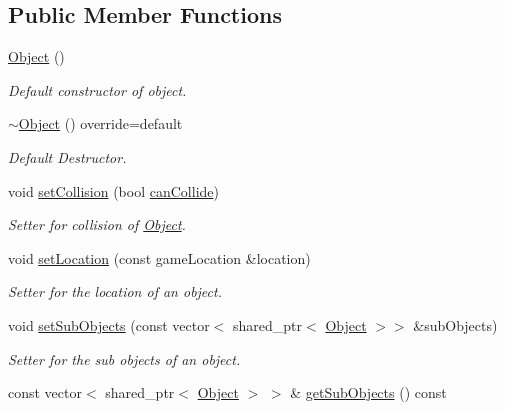 \subsection*{Public Member Functions}
\begin{DoxyCompactItemize}
\item 
\mbox{\label{classObject_a40860402e64d8008fb42329df7097cdb}} 
\hyperlink{classObject_a40860402e64d8008fb42329df7097cdb}{Object} ()
\begin{DoxyCompactList}\small\item\em Default constructor of object. \end{DoxyCompactList}\item 
\mbox{\label{classObject_ab42ffe43dbd5d5cc089493eb60245ee1}} 
\hyperlink{classObject_ab42ffe43dbd5d5cc089493eb60245ee1}{$\sim$\+Object} () override=default
\begin{DoxyCompactList}\small\item\em Default Destructor. \end{DoxyCompactList}\item 
void \hyperlink{classObject_a641a0ab489382ba76bd4c538733cc2a4}{set\+Collision} (bool \hyperlink{classObject_aafe6959a6dcbb8c036af3b489386fd98}{can\+Collide})
\begin{DoxyCompactList}\small\item\em Setter for collision of \hyperlink{classObject}{Object}. \end{DoxyCompactList}\item 
void \hyperlink{classObject_a00673d96b2a75c67f9744f9fc1689727}{set\+Location} (const game\+Location \&location)
\begin{DoxyCompactList}\small\item\em Setter for the location of an object. \end{DoxyCompactList}\item 
void \hyperlink{classObject_a0676101219bc31debb04d9d46f64ee15}{set\+Sub\+Objects} (const vector$<$ shared\+\_\+ptr$<$ \hyperlink{classObject}{Object} $>$$>$ \&sub\+Objects)
\begin{DoxyCompactList}\small\item\em Setter for the sub objects of an object. \end{DoxyCompactList}\item 
const vector$<$ shared\+\_\+ptr$<$ \hyperlink{classObject}{Object} $>$ $>$ \& \hyperlink{classObject_afdafb10e24b1025d598d1efbda61c873}{get\+Sub\+Objects} () const
$$
\end{DoxyCompactItemize}

